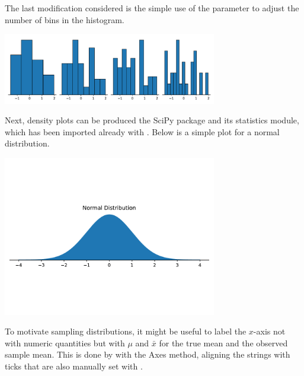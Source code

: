 The last modification considered is the simple use of the  parameter to adjust the number of bins in the histogram. 


\begin{center}
    \includegraphics[width = 0.7\textwidth]{figures/specialplots/bins-hist.pdf}
\end{center}

Next, density plots can be produced the SciPy package and its statistics module, which has been imported already with . Below is a simple plot for a normal distribution. 


\begin{center}
    \includegraphics[width = 0.7\textwidth]{figures/specialplots/normal-pdf.pdf}
\end{center}

To motivate sampling distributions, it might be useful to label the $x$-axis not with numeric quantities but with $\mu$ and $\bar{x}$ for the true mean and the observed sample mean. This is done by with the  Axes method, aligning the strings with ticks that are also manually set with . 




